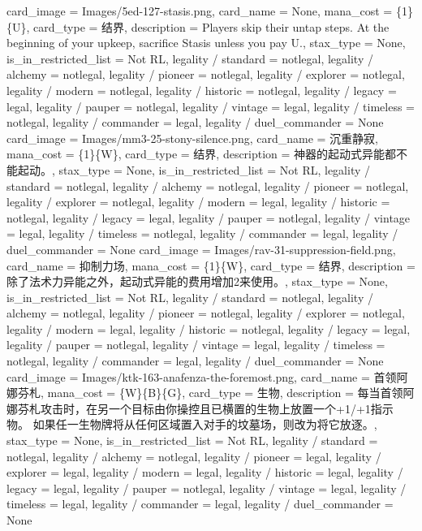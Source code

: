 \documentclass[lang = cn, color = black, 10pt]{AllThatStax}
\begin{document}
\card
{
	card_image = Images/5ed-127-stasis.png,
	card_name = None,
	mana_cost = \{1\}\{U\},
	card_type = 结界,
	description = Players skip their untap steps.
	At the beginning of your upkeep, sacrifice Stasis unless you pay {U}.,
	stax_type = None,
	is_in_restricted_list = Not RL,
	legality / standard = notlegal,
	legality / alchemy = notlegal,
	legality / pioneer = notlegal,
	legality / explorer = notlegal,
	legality / modern = notlegal,
	legality / historic = notlegal,
	legality / legacy = legal,
	legality / pauper = notlegal,
	legality / vintage = legal,
	legality / timeless = notlegal,
	legality / commander = legal,
	legality / duel_commander = None
}
\card
{
	card_image = Images/mm3-25-stony-silence.png,
	card_name = 沉重静寂,
	mana_cost = \{1\}\{W\},
	card_type = 结界,
	description = 神器的起动式异能都不能起动。,
	stax_type = None,
	is_in_restricted_list = Not RL,
	legality / standard = notlegal,
	legality / alchemy = notlegal,
	legality / pioneer = notlegal,
	legality / explorer = notlegal,
	legality / modern = legal,
	legality / historic = notlegal,
	legality / legacy = legal,
	legality / pauper = notlegal,
	legality / vintage = legal,
	legality / timeless = notlegal,
	legality / commander = legal,
	legality / duel_commander = None
}
\card
{
	card_image = Images/rav-31-suppression-field.png,
	card_name = 抑制力场,
	mana_cost = \{1\}\{W\},
	card_type = 结界,
	description = 除了法术力异能之外，起动式异能的费用增加{2}来使用。,
	stax_type = None,
	is_in_restricted_list = Not RL,
	legality / standard = notlegal,
	legality / alchemy = notlegal,
	legality / pioneer = notlegal,
	legality / explorer = notlegal,
	legality / modern = legal,
	legality / historic = notlegal,
	legality / legacy = legal,
	legality / pauper = notlegal,
	legality / vintage = legal,
	legality / timeless = notlegal,
	legality / commander = legal,
	legality / duel_commander = None
}
\card
{
	card_image = Images/ktk-163-anafenza-the-foremost.png,
	card_name = 首领阿娜芬札,
	mana_cost = \{W\}\{B\}\{G\},
	card_type = 生物,
	description = 每当首领阿娜芬札攻击时，在另一个目标由你操控且已横置的生物上放置一个+1/+1指示物。
	如果任一生物牌将从任何区域置入对手的坟墓场，则改为将它放逐。,
	stax_type = None,
	is_in_restricted_list = Not RL,
	legality / standard = notlegal,
	legality / alchemy = notlegal,
	legality / pioneer = legal,
	legality / explorer = legal,
	legality / modern = legal,
	legality / historic = legal,
	legality / legacy = legal,
	legality / pauper = notlegal,
	legality / vintage = legal,
	legality / timeless = legal,
	legality / commander = legal,
	legality / duel_commander = None
}
\end{document}
